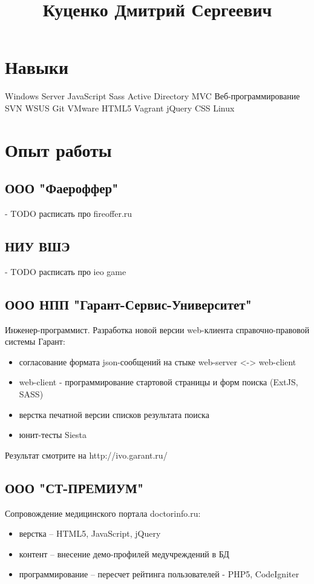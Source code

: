 \documentclass[a4paper,12pt]{article}   %
\title{Куценко Дмитрий Сергеевич}
\author{}
\date{}
\begin{document}

\maketitle

\section*{Навыки}
Windows Server
JavaScript
Sass
Active Directory
MVC
Веб-программирование
SVN
WSUS
Git
VMware
HTML5
Vagrant
jQuery
CSS
Linux

\section*{Опыт работы}

\subsection*{ООО "Фаероффер"} - TODO расписать про fireoffer.ru
\subsection*{НИУ ВШЭ} - TODO расписать про ieo game
\subsection*{ООО НПП "Гарант-Сервис-Университет"}
Инженер-программист. Разработка новой версии web-клиента справочно-правовой системы Гарант:
\begin{itemize}
    \item согласование формата json-сообщений на стыке web-server <-> web-client
    \item web-client - программирование стартовой страницы и форм поиска (ExtJS, SASS)
    \item верстка печатной версии списков результата поиска
    \item юнит-тесты Siesta
\end{itemize}
Результат смотрите на http://ivo.garant.ru/
\subsection*{ООО "СТ-ПРЕМИУМ"}
Сопровождение медицинского портала doctorinfo.ru:
\begin{itemize}
    \item верстка – HTML5, JavaScript, jQuery
    \item контент – внесение демо-профилей медучреждений в БД
    \item программирование – пересчет рейтинга пользователей - PHP5, CodeIgniter
\end{itemize}
\end{document}
